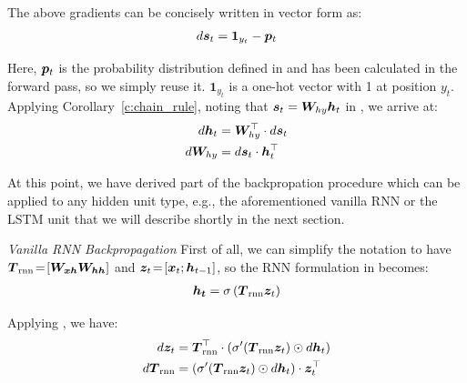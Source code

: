 The above gradients can be concisely written in vector form as:
\begin{align}
d\bm{s}_{t} = \bm{1}_{y_t} - \bm{p}_{t}
\end{align}

Here, $\bm{p}_{t}$ is the probability distribution defined in  and has been calculated in the forward pass,
so we simply reuse it. $\bm{1}_{y_t}$ is a one-hot vector with 1 at position
$y_t$. 
Applying Corollary~\ref{c:chain_rule}, noting that $\bm{s}_{t} = \bm{W}_{hy}\bm{h}_{t}$ in , we
arrive at:
\begin{align}
d\bm{h}_{t} &=  \bm{W}_{hy}^\top \cdot d\bm{s}_{t}\\
d\bm{W}_{hy} &=  d\bm{s}_{t} \cdot \bm{h}_{t}^\top
\end{align}

At this point, we have derived part of the backpropation procedure which can be
applied to any hidden unit type, e.g., the aforementioned vanilla RNN or the
LSTM unit that we will describe shortly in the next section. 

{\it Vanilla RNN Backpropagation} \indent 
First of all, we can simplify the notation to have $\mbox{\boldmath{$T$}}_{\text{rnn}}\!=\![\mbox{\boldmath{$W_{xh}$}}
\mbox{\boldmath{$W_{hh}$}}]$ and $\bm{z}_{t}\!=\![\bm{x}_{t};
\bm{h}_{t-1}]$, so the RNN formulation in  %
becomes:
\begin{align}
\mbox{\boldmath{$h_t$}} = \sigma \left(\mbox{\boldmath{$T$}}_{\text{rnn}} \bm{z}_{t}\right)
\end{align}

Applying , we have:
\begin{align}
d\bm{z}_{t} &=  \mbox{\boldmath{$T$}}_{\text{rnn}}^\top \cdot
\left(\sigma'(\mbox{\boldmath{$T$}}_{\text{rnn}} \bm{z}_{t}) \odot d\bm{h}_{t}\right) \label{e:grad_zt} \\
d\mbox{\boldmath{$T$}}_{\text{rnn}} &=  \left(\sigma'(\mbox{\boldmath{$T$}}_{\text{rnn}} \bm{z}_{t}) \odot d\bm{h}_{t}\right) \cdot \bm{z}_{t}^\top \label{e:grad_rnn}
\end{align}

